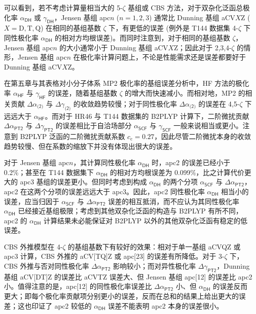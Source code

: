 可以看到，若不考虑计算量相当大的 5-$\zeta$ 基组或 CBS 方法，对于双杂化泛函总极化率 $\alpha_\textsf{DH}$ 或 $\gamma_\textsf{DH}$，Jensen 基组 apc$n$ ($n = 1, 2, 3$) 通常比 Dunning 基组 aCV$X$Z ($X = \mathrm{D, T, Q}$) 在相同的基组基数 $\zeta$ 下，有更低的误差 (例外是 T144 数据集 4-$\zeta$ 下同性极化率 $\alpha_\textsf{DH}$ 的相对方均根误差)。而同时注意到，对于相同的基组基数 $\zeta$，Jensen 基组 apc$n$ 的大小通常小于 Dunning 基组 aCV$X$Z；因此对于 2,3,4-$\zeta$ 的情形，Jensen 基组 apc$n$ 在极化率计算问题上，不论是性能需求还是误差都要好于 Dunning 基组 aCV$X$Z。

在\alert{第五章与其表格}对小分子体系 MP2 极化率的基组误差分析中，HF 方法的极化率 $\alpha_\textsf{HF}$ 与 $\gamma_\textsf{HF}$ 的误差，随着基组基数 $\zeta$ 的增大而快速减小。而相对地，MP2 的相关贡献 $\Delta \alpha_\textsf{(2)}$ 与 $\Delta \gamma_\textsf{(2)}$ 的收敛趋势较慢；对于同性极化率 $\Delta \alpha_\textsf{(2)}$ 的误差在 4,5-$\zeta$ 下远远大于 $\alpha_\textsf{HF}$。而对于 HR46 与 T144 数据集的 B2PLYP 计算下，二阶微扰贡献 $\Delta \alpha_\textsf{PT2}$ 与 $\Delta \gamma_\textsf{PT2}$ 的误差相比于自洽场部分 $\alpha_\textsf{SCF}$ 与 $\gamma_\textsf{SCF}$ 一般来说相当或更小。注意到 B2PLYP 泛函的二阶微扰贡献系数 $c_\mathrm{c} = 0.27$，因此尽管二阶微扰本身的收敛趋势较慢、但在系数的缩放下并没有体现出很大的误差。

对于 Jensen 基组 apc$n$，其计算同性极化率 $\alpha_\textsf{DH}$ 时，apc2 的误差已经小于 0.2\%；甚至在 T144 数据集下 $\alpha_\textsf{DH}$ 的相对方均根误差为 0.099\%，比之计算代价更大的 apc3 基组的误差更小。但同时考虑到构成 $\alpha_\textsf{DH}$ 的两个分项 $\alpha_\textsf{SCF}$ 与 $\Delta \alpha_\textsf{PT2}$，apc2 在这两个分项的误差远远大于 apc3。因此，apc2 同性极化率 $\alpha_\textsf{DH}$ 相当小的误差，应当归因于 $\alpha_\textsf{SCF}$ 与 $\Delta \alpha_\textsf{PT2}$ 误差的相互抵消，而不应认为其同性极化率 $\alpha_\textsf{DH}$ 已经接近基组极限；考虑到其他双杂化泛函的构造与 B2PLYP 有所不同，apc2 的 $\alpha_\textsf{DH}$ 计算结果未必能保证对 B2PLYP 以外的其他双杂化泛函有稳定的低误差。

CBS 外推模型在 4-$\zeta$ 的基组基数下有较好的效果：相对于单一基组 aCVQZ 或 apc3 计算，CBS 外推的 aCV[TQ]Z 或 apc[23] 的误差有所降低。对于 3-$\zeta$ 下，CBS 外推与否对同性极化率 $\Delta \alpha_\textsf{PT2}$ 影响较小；而对异性极化率 $\Delta \gamma_\textsf{PT2}$，Dunning 基组 aCV[DT]Z 的误差比 aCVTZ 误差大、但 Jensen 基组 apc[12] 的误差比 apc2 小。值得注意的是，apc[12] 的同性极化率误差比 $\Delta \alpha_\textsf{PT2}$ 小、但 $\alpha_\textsf{DH}$ 的误差反而更大；即每个极化率贡献项分别更小的误差，反而在总和的结果上给出更大的误差；这也印证了 apc2 较低的 $\alpha_\textsf{DH}$ 误差不能表明 apc2 本身的误差很小。


